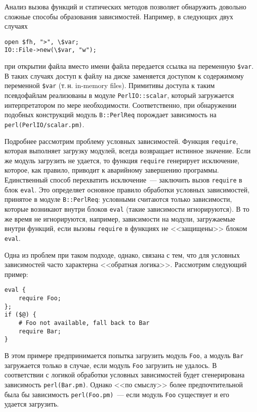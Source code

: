 \documentclass[russian,a4paper,12pt,titlepage]{article}
\begin{document}
Анализ вызова функций и статических методов позволяет обнаружить довольно сложные способы образования
зависимостей.  Например, в следующих двух случаях
\begin{verbatim}
open $fh, ">", \$var;
IO::File->new(\$var, "w");
\end{verbatim}
при открытии файла вместо имени файла передается ссылка на переменную \verb|$var|.
В таких случаях доступ к файлу на диске заменяется доступом к содержимому переменной \verb|$var| (т.\,н. in-memory files).
Примитивы доступа к таким псевдофайлам реализованы в модуле \verb|PerlIO::scalar|, который загружается интерпретатором
по мере необходимости.  Соответственно, при обнаружении подобных конструкций модуль \verb|B::PerlReq| порождает зависимость
на \verb|perl(PerlIO/scalar.pm)|.

Подробнее рассмотрим проблему условных зависимостей.  Функция \verb|require|, которая выполняет загрузку модулей, всегда
возвращает истинное значение.  Если же модуль загрузить не удается, то функция \verb|require| генерирует исключение, которое,
как правило, приводит к аварийному завершению программы.  Единственный способ перехватить исключение~--- заключить вызов
\verb|require| в блок \verb|eval|.  Это определяет основное правило обработки условных зависимостей, принятое в модуле
\verb|B::PerlReq|: условными считаются только зависимости, которые возникают внутри блоков \verb|eval| (такие зависимости игнорируются).
В то же время не игнорируются, например, зависимости на модули, загружаемые внутри функций, если вызовы \verb|require| в функциях
не <<защищены>> блоком \verb|eval|.

Одна из проблем при таком подходе, однако, связана с тем, что для условных зависимостей часто характерна <<обратная логика>>.
Рассмотрим следующий пример:
\begin{verbatim}
eval {
    require Foo;
};
if ($@) {
    # Foo not available, fall back to Bar
    require Bar;
}
\end{verbatim}
В этом примере предпринимается попытка загрузить модуль \verb|Foo|, а модуль \verb|Bar| загружается только в случае,
если модуль \verb|Foo| загрузить не удалось.  В соответствии с логикой обработки условных зависимостей будет сгенерирована
зависимость \verb|perl(Bar.pm)|.  Однако <<по смыслу>> более предпочтительной была бы зависимость \verb|perl(Foo.pm)|~---
если модуль \verb|Foo| существует и его удается загрузить.
\end{document}
